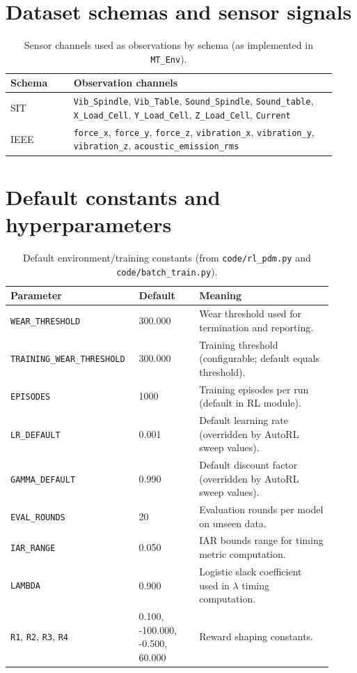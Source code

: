 \documentclass[sn-basic]{sn-jnl} %
\begin{document}
\begin{appendices}
\section{Dataset schemas and sensor signals}
\label{app:schema}
\begin{table}[t]
\centering
\caption{Sensor channels used as observations by schema (as implemented in \texttt{MT\_Env}).}
\label{tab:schema_features}
\begin{tabular}{p{0.18\linewidth} p{0.75\linewidth}}
\toprule
\textbf{Schema} & \textbf{Observation channels}\\
\midrule
SIT & \texttt{Vib\_Spindle}, \texttt{Vib\_Table}, \texttt{Sound\_Spindle}, \texttt{Sound\_table}, \texttt{X\_Load\_Cell}, \texttt{Y\_Load\_Cell}, \texttt{Z\_Load\_Cell}, \texttt{Current}\\
IEEE & \texttt{force\_x}, \texttt{force\_y}, \texttt{force\_z}, \texttt{vibration\_x}, \texttt{vibration\_y}, \texttt{vibration\_z}, \texttt{acoustic\_emission\_rms}\\
\bottomrule
\end{tabular}
\end{table}

\section{Default constants and hyperparameters}
\label{app:defaults}
\begin{table}[t]
\centering
\caption{Default environment/training constants (from \texttt{code/rl\_pdm.py} and \texttt{code/batch\_train.py}).}
\label{tab:defaults}
\begin{tabular}{p{0.34\linewidth} p{0.18\linewidth} p{0.40\linewidth}}
\toprule
\textbf{Parameter} & \textbf{Default} & \textbf{Meaning}\\
\midrule
\texttt{WEAR\_THRESHOLD} & 300.000 & Wear threshold used for termination and reporting.\\
\texttt{TRAINING\_WEAR\_THRESHOLD} & 300.000 & Training threshold (configurable; default equals threshold).\\
\texttt{EPISODES} & 1000 & Training episodes per run (default in RL module).\\
\texttt{LR\_DEFAULT} & 0.001 & Default learning rate (overridden by AutoRL sweep values).\\
\texttt{GAMMA\_DEFAULT} & 0.990 & Default discount factor (overridden by AutoRL sweep values).\\
\texttt{EVAL\_ROUNDS} & 20 & Evaluation rounds per model on unseen data.\\
\texttt{IAR\_RANGE} & 0.050 & IAR bounds range for timing metric computation.\\
\texttt{LAMBDA} & 0.900 & Logistic slack coefficient used in $\lambda$ timing computation.\\
\texttt{R1}, \texttt{R2}, \texttt{R3}, \texttt{R4} & 0.100, -100.000, -0.500, 60.000 & Reward shaping constants.\\
\bottomrule
\end{tabular}
\end{table}


\end{appendices}
\end{document}
